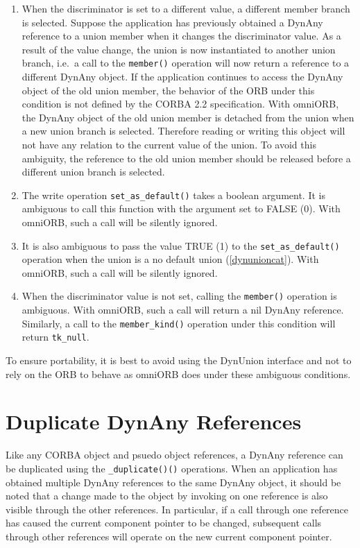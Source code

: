 \documentclass[11pt,twoside,a4paper]{book}
\newcommand{\code}[1]{\texttt{#1}}
\newcommand{\op}[1]{\texttt{#1()}}
\begin{document}
\begin{enumerate}

\item When the discriminator is set to a different value, a different
member branch is selected. Suppose the application has previously
obtained a DynAny reference to a union member when it changes the
discriminator value. As a result of the value change, the union is now
instantiated to another union branch, i.e.\ a call to the \op{member}
operation will now return a reference to a different DynAny object. If
the application continues to access the DynAny object of the old union
member, the behavior of the ORB under this condition is not defined by
the CORBA 2.2 specification. With omniORB, the DynAny object of the
old union member is detached from the union when a new union branch is
selected. Therefore reading or writing this object will not have any
relation to the current value of the union. To avoid this ambiguity,
the reference to the old union member should be released before a
different union branch is selected.

\item The write operation \op{set\_as\_default} takes a boolean
argument. It is ambiguous to call this function with the argument set
to FALSE (0). With omniORB, such a call will be silently ignored.

\item It is also ambiguous to pass the value TRUE (1) to the
\op{set\_as\_default} operation when the union is a no default union
(\ref{dynunioncat}). With omniORB, such a call will be silently
ignored.

\item When the discriminator value is not set, calling the \op{member}
operation is ambiguous. With omniORB, such a call will return a nil
DynAny reference. Similarly, a call to the \op{member\_kind} operation
under this condition will return \code{tk\_null}.

\end{enumerate}

To ensure portability, it is best to avoid using the DynUnion
interface and not to rely on the ORB to behave as omniORB does under
these ambiguous conditions.

\section{Duplicate DynAny References}

Like any CORBA object and psuedo object references, a DynAny reference
can be duplicated using the \op{\_duplicate()} operations. When an
application has obtained multiple DynAny references to the same DynAny
object, it should be noted that a change made to the object by
invoking on one reference is also visible through the other
references. In particular, if a call through one reference has caused
the current component pointer to be changed, subsequent calls through
other references will operate on the new current component pointer.
\end{document}
